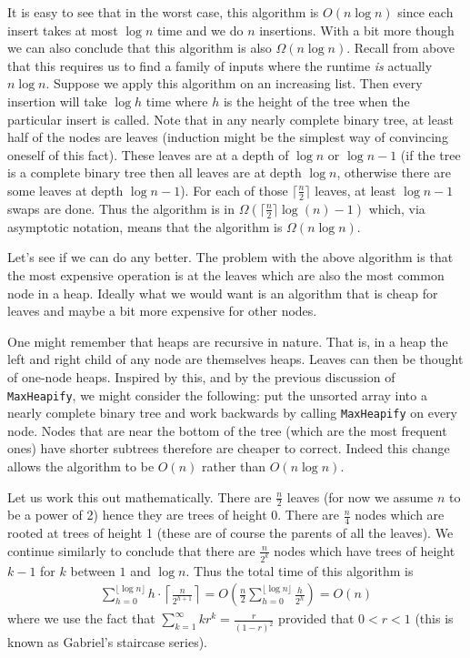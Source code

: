 It is easy to see that in the worst case, this algorithm is $O(n \log n)$ since each insert takes at most $\log n$ time and we do $n$ insertions. With a bit more though we can also conclude that this algorithm is also $\Omega(n \log n)$. Recall from above that this requires us to find a family of inputs where the runtime \textit{is} actually $n \log n$. Suppose we apply this algorithm on an increasing list. Then every insertion will take $\log h$ time where $h$ is the height of the tree when the particular insert is called. Note that in any nearly complete binary tree, at least half of the nodes are leaves (induction might be the simplest way of convincing oneself of this fact). These leaves are at a depth of $\log n$ or $\log n - 1$ (if the tree is a complete binary tree then all leaves are at depth $\log n$, otherwise there are some leaves at depth $\log n - 1$). For each of those $\lceil \frac{n}{2} \rceil$ leaves, at least $\log n - 1$ swaps are done. Thus the algorithm is in $\Omega(\lceil \frac{n}{2} \rceil \log(n) - 1)$ which, via asymptotic notation, means that the algorithm is $\Omega(n \log n)$.

Let's see if we can do any better. The problem with the above algorithm is that the most expensive operation is at the leaves which are also the most common node in a heap. Ideally what we would want is an algorithm that is cheap for leaves and maybe a bit more expensive for other nodes. 

One might remember that heaps are recursive in nature. That is, in a heap the left and right child of any node are themselves heaps. Leaves can then be thought of one-node heaps. Inspired by this, and by the previous discussion of \texttt{MaxHeapify}, we might consider the following: put the unsorted array into a nearly complete binary tree and work backwards by calling \texttt{MaxHeapify} on every node. Nodes that are near the bottom of the tree (which are the most frequent ones) have shorter subtrees therefore are cheaper to correct. Indeed this change allows the algorithm to be $O(n)$ rather than $O(n \log n)$.

Let us work this out mathematically. There are $\frac{n}{2}$ leaves (for now we assume $n$ to be a power of 2) hence they are trees of height 0. There are $\frac{n}{4}$ nodes which are rooted at trees of height 1 (these are of course the parents of all the leaves). We continue similarly to conclude that there are $\frac{n}{2^{k}}$ nodes which have trees of height $k - 1$ for $k$ between $1$ and $\log n$. Thus the total time of this algorithm is
\begin{align*}
    \sum_{h = 0}^{\lfloor \log n\rfloor} h \cdot \left\lceil \frac{n}{2^{h + 1}}  \right\rceil = O\left( \frac{n}{2} \sum_{h = 0}^{\lfloor \log n \rfloor} \frac{h}{2^h} \right)
    = O \left( n \right)
\end{align*}
where we use the fact that $\sum_{k = 1}^{\infty} kr^k = \frac{r}{(1 - r)^2}$ provided that $0 < r < 1$ (this is known as Gabriel's staircase series).